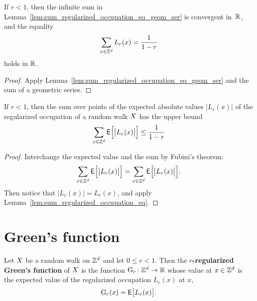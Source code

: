 \begin{lemma}
  \label{lem:sum_regularized_occupation_eq}
  If $r<1$, then the infinite sum in
  Lemma~\ref{lem:sum_regularized_occupation_eq_geom_ser} is convergent
  in~$\mathbb{R}$, and the equality
  \begin{align*}
  \sum_{x \in \mathbb{Z}^d} L_r(x) = \frac{1}{1-r}
  \end{align*}
  holds in $\mathbb{R}$.
\end{lemma}
\begin{proof}
Apply Lemma~\ref{lem:sum_regularized_occupation_eq_geom_ser}
and the sum of a geometric series.
\end{proof}

\begin{lemma}
  \label{lem:sum_expected_regularized_occupation_bound}
  If $r<1$, then the
  sum over points of the expected absolute values $|L_r(x)|$ of the regularized
  occupation of a random walk $X$ has the upper bound
  \begin{align*}
  \sum_{x \in \mathbb{Z}^d} \mathsf{E} \Big[ \big| L_r(x) \big| \Big] \le \frac{1}{1-r} 
  \end{align*}
\end{lemma}
\begin{proof}
Interchange the expected value and the sum by Fubini's theorem:
\begin{align*}
\sum_{x \in \mathbb{Z}^d} \mathsf{E} \Big[ \big| L_r(x) \big| \Big]
= \sum_{x \in \mathbb{Z}^d} \mathsf{E} \Big[ \big| L_r(x) \big| \Big] .
\end{align*}
Then notice that $|L_r(x)| = L_r(x)$, and apply
Lemma~\ref{lem:sum_regularized_occupation_eq}.
\end{proof}



\section{Green's function}

\begin{definition}
  \label{def:Green_function}
  \leanok
  Let $X$ be a random walk on $\mathbb{Z}^d$ and let $0 \le r < 1$.
  Then the \textbf{$r$-regularized Green's function}
  of $X$ is the function $\mathrm{G}_{r} \colon \mathbb{Z}^d \to \mathbb{R}$
  whose value at $x \in \mathbb{Z}^d$ is the expected value of the
  regularized occupation $L_r(x)$ at $x$,
  \begin{align}\label{eq: reg Green}
  \mathrm{G}_{r}(x) = \mathsf{E} \big[ L_r(x) \big] .
  \end{align}
\end{definition}

